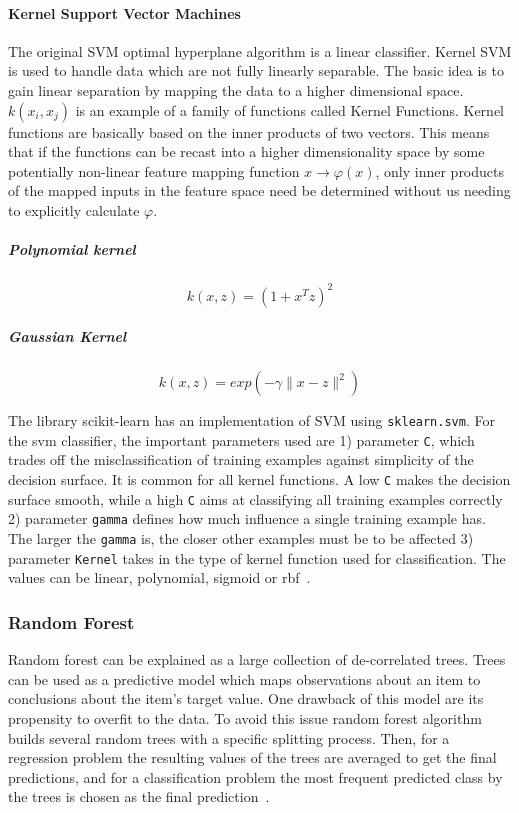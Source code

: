 \documentclass[letterpaper,10pt]{article}
\theoremstyle{mytheor}
\begin{document}
\paragraph{Kernel Support Vector Machines}
The original SVM optimal hyperplane algorithm is a linear classifier. Kernel SVM is used to handle data which are not fully linearly separable. The basic idea is to gain linear separation by mapping the data to a higher dimensional space. $k(x_i, x_j)$ is an example of a family of functions called Kernel Functions. Kernel functions are basically based on the inner products of two vectors. This means that if the functions can be recast into a higher dimensionality space by some potentially non-linear feature mapping function $x \rightarrow \varphi(x)$, only inner products of the mapped inputs in the feature space need be determined without us needing to explicitly calculate $\varphi$.

\subparagraph{Polynomial kernel}
\begin{equation}
k(x, z) = (1 + x^T z)^2
\end{equation}

\subparagraph{Gaussian Kernel}
\begin{equation}
k(x, z) = exp(-\gamma\|x-z\|^2)
\end{equation}

The library scikit-learn has an implementation of SVM using \lstinline|sklearn.svm|. For the svm classifier, the important  parameters used are 1) parameter \lstinline|C|, which trades off the misclassification of training examples against simplicity of the decision surface. It is common for all kernel functions. A low \lstinline|C| makes the decision surface smooth, while a high \lstinline|C| aims at classifying all training examples correctly 2) parameter \lstinline|gamma| defines how much influence a single training example has. The larger the \lstinline|gamma| is, the closer other examples must be to be affected 3) parameter \lstinline|Kernel| takes in the type of kernel function used for classification. The values can be linear, polynomial, sigmoid or rbf~\cite{svmsklearn}.


\subsubsection{Random Forest}
Random forest can be explained as a large collection of de-correlated trees. Trees can be used as a predictive model which maps observations about an item to conclusions about the item's target value. One drawback of this model are its propensity  to overfit to the data. To avoid this issue random forest algorithm builds several random trees with a specific splitting process. Then, for a regression problem the resulting values of the trees are averaged to get the final predictions, and for a classification problem the most frequent predicted class by the trees is chosen as the final prediction~\cite{friedman2001elements}. 
\end{document}
